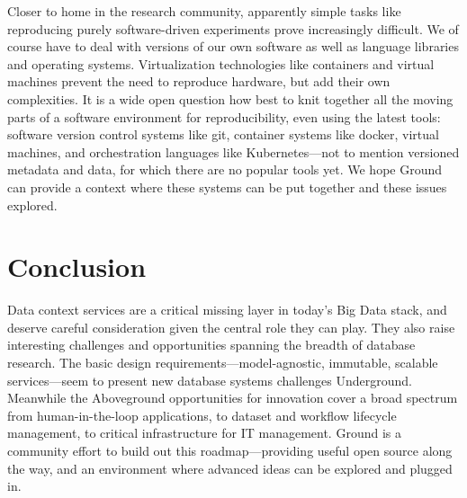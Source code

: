 \documentclass{sig-alternate}
\begin{document}
Closer to home in the research community, apparently simple tasks like reproducing purely software-driven experiments prove increasingly difficult.  We of course have to deal with versions of our own software as well as language libraries and operating systems. Virtualization technologies like containers and virtual machines prevent the need to reproduce hardware, but add their own complexities. It is a wide open question how best to knit together all the moving parts of a software environment for reproducibility, even using the latest tools: software version control systems like git, container systems like docker, virtual machines, and orchestration languages like Kubernetes---not to mention versioned metadata and data, for which there are no popular tools yet. We hope Ground can provide a context where these systems can be put together and these issues explored.

\smallitembot


\section{Conclusion}
\label{sec:conclusion}
Data context services are a critical missing layer in today's Big Data stack, and deserve careful consideration given the central role they can play. 
They also raise interesting challenges and opportunities spanning the breadth of database research. 
The basic design requirements---model-agnostic, immutable, scalable services---seem to present new database systems challenges Underground. 
Meanwhile the Aboveground opportunities for innovation cover a broad spectrum from human-in-the-loop applications, to dataset and workflow lifecycle management, to critical infrastructure for IT management. 
Ground is a community effort to build out this roadmap---providing useful open source along the way, and an environment where advanced ideas can be explored and plugged in.


\end{document}
